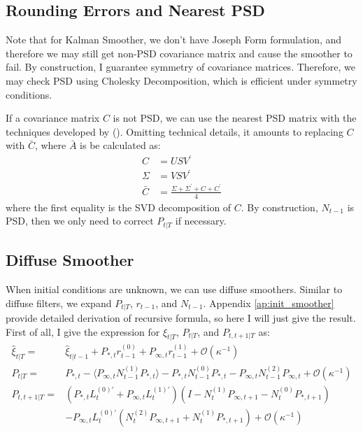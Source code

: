 \documentclass[10pt]{article}
\numberwithin{equation}{section}
\begin{document}
\subsection{Rounding Errors and Nearest PSD}
Note that for Kalman Smoother, we don't have Joseph Form formulation, and therefore we may still get non-PSD covariance matrix and cause the smoother to fail. By construction, I guarantee symmetry of covariance matrices. Therefore, we may check PSD using Cholesky Decomposition, which is efficient under symmetry conditions.

If a covariance matrix $C$ is not PSD, we can use the nearest PSD matrix with the techniques developed by (\cite{higham_1988}). Omitting technical details, it amounts to replacing $C$ with $\bar{C}$, where $\bar{A}$ is be calculated as:
\begin{align*}
    C &= USV^{'} \\
    \Sigma &= VSV^{'} \\
    \bar{C} &= \frac{\Sigma + \Sigma^{'} + C + C^{'}}{4}
\end{align*}
where the first equality is the SVD decomposition of $C$. By construction, $N_{t-1}$ is PSD, then we only need to correct $P_{t|T}$ if necessary. 

\subsection{Diffuse Smoother}
When initial conditions are unknown, we can use diffuse smoothers. Similar to diffuse filters, we expand $P_{t|T}$, $r_{t-1}$, and $N_{t-1}$. Appendix \ref{ap:init_smoother} provide detailed derivation of recursive formula, so here I will just give the result. First of all, I give the expression for $\hat{\xi}_{t|T}$, $P_{t|T}$, and $P_{t,t+1|T}$ as:
\begin{align}
    \hat{\xi}_{t|T} =& \hat{\xi}_{t|t-1} + P_{*,t}r_{t-1}^{(0)}+P_{\infty,t}r_{t-1}^{(1)}+\mathcal{O}(\kappa^{-1}) \label{eq:diff_xi} \\
    P_{t|T} =& P_{*,t} - \langle P_{\infty,t}N_{t-1}^{(1)}P_{*,t}\rangle - P_{*,t}N_{t-1}^{(0)}P_{*,t} 
        - P_{\infty,t}N_{t-1}^{(2)}P_{\infty,t} + \mathcal{O}(\kappa^{-1}) \label{eq:diff_P} \\
    P_{t,t+1|T} =& (P_{*,t}L_t^{(0)'}+P_{\infty,t}L_t^{(1)'})(I-N_t^{(1)}P_{\infty,t+1}-N_t^{(0)}P_{*,t+1}) \nonumber \\
    &- P_{\infty,t}L_t^{(0)'}(N_t^{(2)}P_{\infty,t+1}+N_t^{(1)}P_{*,t+1}) + \mathcal{O}(\kappa^{-1}) \label{eq:diff_Pcov}
\end{align}
\end{document}
